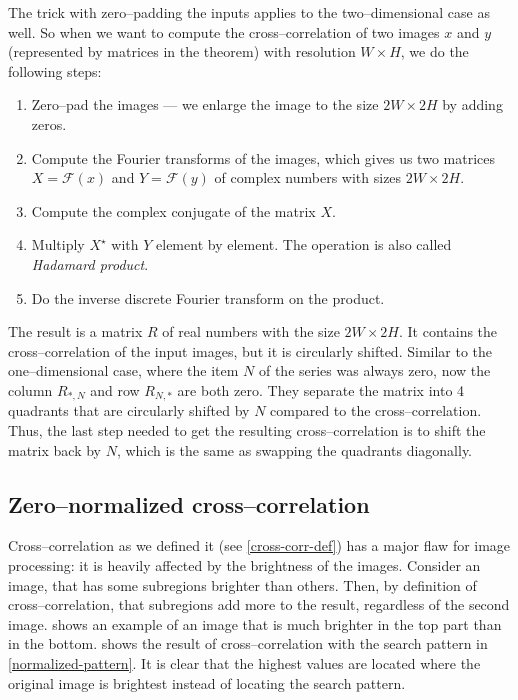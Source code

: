 The trick with zero--padding the inputs applies to the two--dimensional case as well. So when we want to compute the cross--correlation of two images $x$ and $y$ (represented by matrices in the theorem) with resolution $W \times H$, we do the following steps:
\begin{enumerate}
	\item Zero--pad the images --- we enlarge the image to the size $2W \times 2H$ by adding zeros.
	\item Compute the Fourier transforms of the images, which gives us two matrices $X = \mathcal{F}(x)$ and $Y =\mathcal{F}(y)$ of complex numbers with sizes $2W \times 2H$.
	\item Compute the complex conjugate of the matrix $X$.
	\item Multiply $X^\star$ with $Y$ element by element. The operation is also called \emph{Hadamard product}.
	\item Do the inverse discrete Fourier transform on the product.
\end{enumerate}
The result is a matrix $R$ of real numbers with the size $2W \times 2H$. It contains the cross--correlation of the input images, but it is circularly shifted. Similar to the one--dimensional case, where the item $N$ of the series was always zero, now the column $R_{*,N}$ and row $R_{N,*}$ are both zero. They separate the matrix into 4 quadrants that are circularly shifted by $N$ compared to the cross--correlation. Thus, the last step needed to get the resulting cross--correlation is to shift the matrix back by $N$, which is the same as swapping the quadrants diagonally.

\subsection{Zero--normalized cross--correlation}

Cross--correlation as we defined it (see \cref{cross-corr-def}) has a major flaw for image processing: it is heavily affected by the brightness of the images. Consider an image, that has some subregions brighter than others. Then, by definition of cross--correlation, that subregions add more to the result, regardless of the second image.  shows an example of an image that is much brighter in the top part than in the bottom.  shows the result of cross--correlation with the search pattern in \cref{normalized-pattern}. It is clear that the highest values are located where the original image is brightest instead of locating the search pattern.

